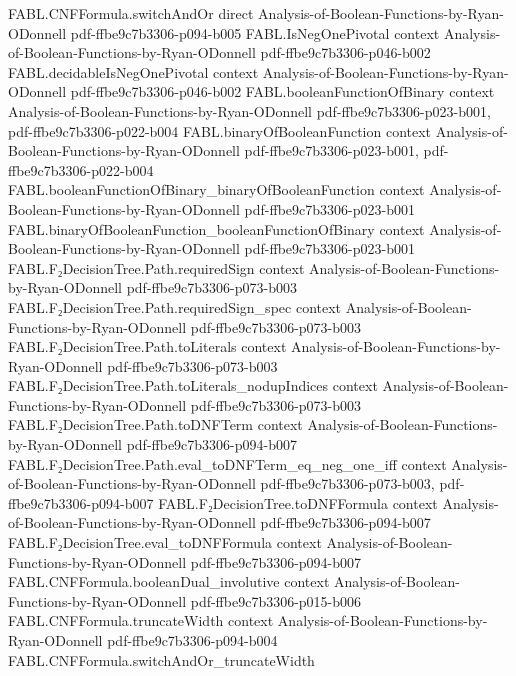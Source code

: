 \begin{theorem}
\proofstep
  {FABL.CNFFormula.switchAndOr}
  {direct}
  {Analysis-of-Boolean-Functions-by-Ryan-ODonnell}
  {pdf-ffbe9c7b3306-p094-b005}
\proofstep
  {FABL.IsNegOnePivotal}
  {context}
  {Analysis-of-Boolean-Functions-by-Ryan-ODonnell}
  {pdf-ffbe9c7b3306-p046-b002}
\proofstep
  {FABL.decidableIsNegOnePivotal}
  {context}
  {Analysis-of-Boolean-Functions-by-Ryan-ODonnell}
  {pdf-ffbe9c7b3306-p046-b002}
\proofstep
  {FABL.booleanFunctionOfBinary}
  {context}
  {Analysis-of-Boolean-Functions-by-Ryan-ODonnell}
  {pdf-ffbe9c7b3306-p023-b001,
    pdf-ffbe9c7b3306-p022-b004}
\proofstep
  {FABL.binaryOfBooleanFunction}
  {context}
  {Analysis-of-Boolean-Functions-by-Ryan-ODonnell}
  {pdf-ffbe9c7b3306-p023-b001,
    pdf-ffbe9c7b3306-p022-b004}
\proofstep
  {FABL.booleanFunctionOfBinary_binaryOfBooleanFunction}
  {context}
  {Analysis-of-Boolean-Functions-by-Ryan-ODonnell}
  {pdf-ffbe9c7b3306-p023-b001}
\proofstep
  {FABL.binaryOfBooleanFunction_booleanFunctionOfBinary}
  {context}
  {Analysis-of-Boolean-Functions-by-Ryan-ODonnell}
  {pdf-ffbe9c7b3306-p023-b001}
\proofstep
  {FABL.F₂DecisionTree.Path.requiredSign}
  {context}
  {Analysis-of-Boolean-Functions-by-Ryan-ODonnell}
  {pdf-ffbe9c7b3306-p073-b003}
\proofstep
  {FABL.F₂DecisionTree.Path.requiredSign_spec}
  {context}
  {Analysis-of-Boolean-Functions-by-Ryan-ODonnell}
  {pdf-ffbe9c7b3306-p073-b003}
\proofstep
  {FABL.F₂DecisionTree.Path.toLiterals}
  {context}
  {Analysis-of-Boolean-Functions-by-Ryan-ODonnell}
  {pdf-ffbe9c7b3306-p073-b003}
\proofstep
  {FABL.F₂DecisionTree.Path.toLiterals_nodupIndices}
  {context}
  {Analysis-of-Boolean-Functions-by-Ryan-ODonnell}
  {pdf-ffbe9c7b3306-p073-b003}
\proofstep
  {FABL.F₂DecisionTree.Path.toDNFTerm}
  {context}
  {Analysis-of-Boolean-Functions-by-Ryan-ODonnell}
  {pdf-ffbe9c7b3306-p094-b007}
\proofstep
  {FABL.F₂DecisionTree.Path.eval_toDNFTerm_eq_neg_one_iff}
  {context}
  {Analysis-of-Boolean-Functions-by-Ryan-ODonnell}
  {pdf-ffbe9c7b3306-p073-b003,
    pdf-ffbe9c7b3306-p094-b007}
\proofstep
  {FABL.F₂DecisionTree.toDNFFormula}
  {context}
  {Analysis-of-Boolean-Functions-by-Ryan-ODonnell}
  {pdf-ffbe9c7b3306-p094-b007}
\proofstep
  {FABL.F₂DecisionTree.eval_toDNFFormula}
  {context}
  {Analysis-of-Boolean-Functions-by-Ryan-ODonnell}
  {pdf-ffbe9c7b3306-p094-b007}
\proofstep
  {FABL.CNFFormula.booleanDual_involutive}
  {context}
  {Analysis-of-Boolean-Functions-by-Ryan-ODonnell}
  {pdf-ffbe9c7b3306-p015-b006}
\proofstep
  {FABL.CNFFormula.truncateWidth}
  {context}
  {Analysis-of-Boolean-Functions-by-Ryan-ODonnell}
  {pdf-ffbe9c7b3306-p094-b004}
\proofstep
  {FABL.CNFFormula.switchAndOr_truncateWidth}

\end{theorem}
